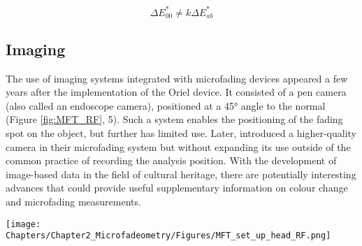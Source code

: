 \begin{equation}
    \Delta E^*_{00} \neq k \Delta E^*_{ab}
\label{eq:dE_inequality}
\end{equation}

\newpage
\subsection{Imaging}

The use of imaging systems integrated with microfading devices appeared a few years after the implementation of the Oriel device. It consisted of a pen camera (also called an endoscope camera), positioned at a \ang{45} angle to the normal (Figure \ref{fig:MFT_RF}, 5). Such a system enables the positioning of the fading spot on the object, but further has limited use. Later, \citet{lojewski_note_2011} introduced a higher-quality camera in their microfading system but without expanding its use outside of the common practice of recording the analysis position. With the development of image-based data in the field of cultural heritage, there are potentially interesting advances that could provide useful supplementary information on colour change and microfading measurements.\\

\begin{figure*}[!h]
\centering
\texttt{[image: Chapters/Chapter2\_Microfadeometry/Figures/MFT\_set\_up\_head\_RF.png]}
\caption[\hspace{0.3cm}Details of an Oriel microfading system]{Details of an Oriel microfading system (courtesy of the Rathgen Forschungslabor, Berlin).}
\label{fig:MFT_RF}
\end{figure*}
